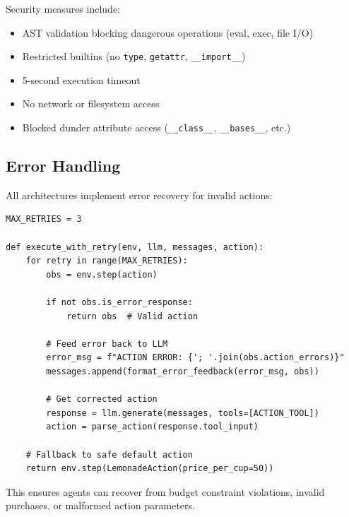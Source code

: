 Security measures include:
\begin{itemize}
    \item AST validation blocking dangerous operations (eval, exec, file I/O)
    \item Restricted builtins (no \texttt{type}, \texttt{getattr}, \texttt{\_\_import\_\_})
    \item 5-second execution timeout
    \item No network or filesystem access
    \item Blocked dunder attribute access (\texttt{\_\_class\_\_}, \texttt{\_\_bases\_\_}, etc.)
\end{itemize}

\subsection{Error Handling}

All architectures implement error recovery for invalid actions:

\begin{verbatim}
MAX_RETRIES = 3

def execute_with_retry(env, llm, messages, action):
    for retry in range(MAX_RETRIES):
        obs = env.step(action)
        
        if not obs.is_error_response:
            return obs  # Valid action
        
        # Feed error back to LLM
        error_msg = f"ACTION ERROR: {'; '.join(obs.action_errors)}"
        messages.append(format_error_feedback(error_msg, obs))
        
        # Get corrected action
        response = llm.generate(messages, tools=[ACTION_TOOL])
        action = parse_action(response.tool_input)
    
    # Fallback to safe default action
    return env.step(LemonadeAction(price_per_cup=50))
\end{verbatim}

This ensures agents can recover from budget constraint violations, invalid purchases, or malformed action parameters.

